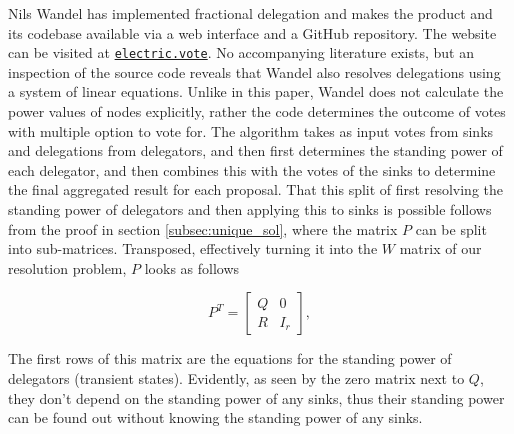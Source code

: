 Nils Wandel has implemented fractional delegation and makes the product and its codebase available via a web interface and a GitHub repository. The website can be visited at \texttt{\url{electric.vote}}. No accompanying literature exists, but an inspection of the source code reveals that Wandel also resolves delegations using a system of linear equations. Unlike in this paper, Wandel does not calculate the power values of nodes explicitly, rather the code determines the outcome of votes with multiple option to vote for. The algorithm takes as input votes from sinks and delegations from delegators, and then first determines the standing power of each delegator, and then combines this with the votes of the sinks to determine the final aggregated result for each proposal. That this split of first resolving the standing power of delegators and then applying this to sinks is possible follows from the proof in section \cref{subsec:unique_sol}, where the matrix $P$ can be split into sub-matrices. Transposed, effectively turning it into the $W$ matrix of our resolution problem, $P$ looks as follows

\[
P^T = \begin{bmatrix}
Q & 0 \\
R & I_r
\end{bmatrix},
\]

The first rows of this matrix are the equations for the standing power of delegators (transient states). Evidently, as seen by the zero matrix next to $Q$, they don't depend on the standing power of any sinks, thus their standing power can be found out without knowing the standing power of any sinks. \cite{nilsElectricvote2020}
